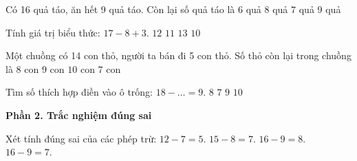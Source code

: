 \begin{ex} %
Có 16 quả táo, ăn hết 9 quả táo. Còn lại số quả táo là
\choice
{$6$ quả}
{$8$ quả}
{\True $7$ quả}
{$9$ quả}
\end{ex}

\begin{ex} %
Tính giá trị biểu thức: $17 - 8 + 3$.
\choice
{\True $12$}
{$11$}
{$13$}
{$10$}
\end{ex}

\begin{ex} %
Một chuồng có 14 con thỏ, người ta bán đi 5 con thỏ. Số thỏ còn lại trong chuồng là
\choice
{$8$ con}
{\True $9$ con}
{$10$ con}
{$7$ con}
\end{ex}

\begin{ex} %
Tìm số thích hợp điền vào ô trống: $18 - \dots = 9$.
\choice
{$8$}
{$7$}
{\True $9$}
{$10$}
\end{ex}

\textbf{Phần 2. Trắc nghiệm đúng sai}

\begin{ex} %
Xét tính đúng sai của các phép trừ:
\choiceTF
{\True $12 - 7 = 5$.}
{\True $15 - 8 = 7$.}
{$16 - 9 = 8$.}
{\True $16 - 9 = 7$.}
\end{ex}

